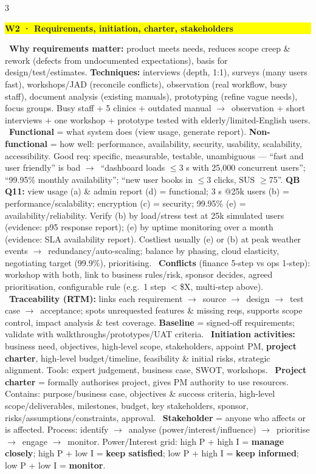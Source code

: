 \documentclass[a4paper,landscape]{article}
\newcommand{\hlhighlight}[1]{\begingroup\setlength{\fboxsep}{0pt}\colorbox{yellow}{\strut\textbf{#1}}\endgroup}
\newcommand{\concept}[1]{\textbf{#1}}
\newcommand{\lbl}[1]{\textbf{#1}}
\newcommand{\kh}[1]{{\setlength{\fboxsep}{0.5pt}\colorbox{keyhlcolor}{#1}}}
\newcommand{\ra}{$\rightarrow$}
\begin{document}
\begin{multicols}{3}
\par\smallskip\noindent\hlhighlight{W2 · Requirements, initiation, charter, stakeholders}\ \concept{Why requirements matter:} product meets needs, reduces scope creep \& rework (defects from undocumented expectations), basis for design/test/estimates. \concept{Techniques:} interviews (depth, 1:1), surveys (many users fast), workshops/JAD (reconcile conflicts), observation (real workflow, busy staff), document analysis (existing manuals), prototyping (refine vague needs), focus groups. Busy staff + 5 clinics + outdated manual \ra\ observation + short interviews + one workshop + prototype tested with elderly/limited-English users. \textbullet\ \concept{Functional} = what system does (view usage, generate report). \concept{Non-functional} = how well: performance, availability, security, usability, scalability, accessibility. \kh{Good req: specific, measurable, testable, unambiguous} --- ``fast and user friendly'' is bad \ra\ ``dashboard loads $\le$3 s with 25{,}000 concurrent users''; ``99.95\% monthly availability''; ``new user books in $\le$3 clicks, SUS $\ge$75''. \lbl{QB Q11:} view usage (a) \& admin report (d) = functional; 3 s @25k users (b) = performance/scalability; encryption (c) = security; 99.95\% (e) = availability/reliability. Verify (b) by load/stress test at 25k simulated users (evidence: p95 response report); (e) by uptime monitoring over a month (evidence: SLA availability report). Costliest usually (e) or (b) at peak weather events \ra\ redundancy/auto-scaling; balance by phasing, cloud elasticity, negotiating target (99.9\%), prioritising. \textbullet\ \concept{Conflicts} (finance 5-step vs ops 1-step): workshop with both, link to business rules/risk, sponsor decides, agreed prioritisation, configurable rule (e.g.\ 1 step $<$\$X, multi-step above). \textbullet\ \concept{Traceability (RTM):} links each requirement \ra\ source \ra\ design \ra\ test case \ra\ acceptance; spots unrequested features \& missing reqs, supports scope control, impact analysis \& test coverage. \lbl{Baseline} = signed-off requirements; validate with walkthroughs/prototypes/UAT criteria. \textbullet\ \concept{Initiation activities:} business need, objectives, high-level scope, stakeholders, appoint PM, \lbl{project charter}, high-level budget/timeline, feasibility \& initial risks, strategic alignment. Tools: expert judgement, business case, SWOT, workshops. \textbullet\ \concept{Project charter} = formally authorises project, gives PM authority to use resources. Contains: purpose/business case, objectives \& success criteria, high-level scope/deliverables, milestones, budget, key stakeholders, sponsor, risks/assumptions/constraints, approval. \textbullet\ \concept{Stakeholder} = anyone who affects or is affected. Process: identify \ra\ analyse (power/interest/influence) \ra\ prioritise \ra\ engage \ra\ monitor. \kh{Power/Interest grid:} high P + high I = \lbl{manage closely}; high P + low I = \lbl{keep satisfied}; low P + high I = \lbl{keep informed}; low P + low I = \lbl{monitor}.\par


\end{multicols}
\end{document}
